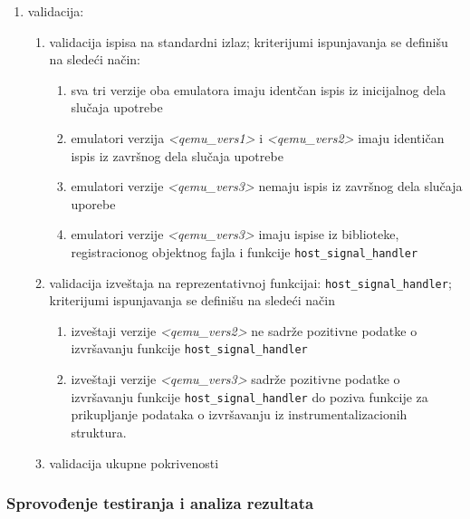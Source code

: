 \documentclass[12pt,oneside]{memoir}
\newcommand{\kod}[1]{\texttt{#1}}
\newcommand{\strano}[1]{\textit{#1}}
\begin{document}
\begin{enumerate}
\item validacija: 
\begin{enumerate}
\item validacija ispisa na standardni izlaz; kriterijumi ispunjavanja se definišu na sledeći način:
\begin{enumerate}
\item sva tri verzije oba emulatora imaju identčan ispis iz inicijalnog dela slučaja upotrebe
\item emulatori verzija \strano{<qemu\_vers1>} i \strano{<qemu\_vers2>} imaju identičan ispis iz završnog dela slučaja upotrebe
\item emulatori verzije \strano{<qemu\_vers3>} nemaju ispis iz završnog dela slučaja uporebe
\item emulatori verzije \strano{<qemu\_vers3>} imaju ispise iz biblioteke, registracionog objektnog fajla i funkcije \kod{host\_signal\_handler}
\end{enumerate}

\item validacija izveštaja na reprezentativnoj funkcijai: \kod{host\_signal\_handler}; kriterijumi ispunjavanja se definišu na sledeći način
\begin{enumerate}
\item izveštaji verzije \strano{<qemu\_vers2>} ne sadrže pozitivne podatke o izvršavanju funkcije \kod{host\_signal\_handler}
\item izveštaji verzije \strano{<qemu\_vers3>} sadrže pozitivne podatke o izvršavanju funkcije \kod{host\_signal\_handler} do poziva funkcije za prikupljanje podataka o izvršavanju iz instrumentalizacionih struktura.
\end{enumerate}

\item validacija ukupne pokrivenosti 
\end{enumerate}

\end{enumerate}


\subsubsection{Sprovođenje testiranja i analiza rezultata}
\end{document}
